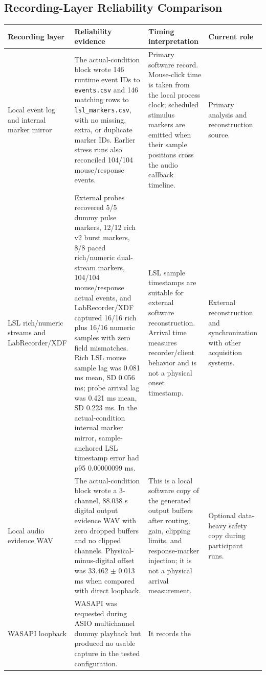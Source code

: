 \documentclass[11pt]{article}
\begin{document}
\subsection{Recording-Layer Reliability Comparison}

\begin{longtable}{|p{}|p{}|p{}|p{}|}
\hline
\textbf{Recording layer} & \textbf{Reliability evidence} & \textbf{Timing interpretation} & \textbf{Current role} \\
\hline
Local event log and internal marker mirror & The actual-condition block wrote
146 runtime event IDs to \texttt{events.csv} and 146 matching rows to
\texttt{lsl\_markers.csv}, with no missing, extra, or duplicate marker IDs.
Earlier stress runs also reconciled 104/104 mouse/response events. & Primary
software record. Mouse-click time is taken from the local process clock;
scheduled stimulus markers are emitted when their sample positions cross the
audio callback timeline. & Primary analysis and reconstruction source. \\
\hline
LSL rich/numeric streams and LabRecorder/XDF & External probes recovered 5/5
dummy pulse markers, 12/12 rich v2 burst markers, 8/8 paced rich/numeric
dual-stream markers, 104/104 mouse/response actual events, and LabRecorder/XDF
captured 16/16 rich plus 16/16 numeric samples with zero field mismatches. Rich
LSL mouse sample lag was 0.081 ms mean, SD 0.056 ms; probe arrival lag was
0.421 ms mean, SD 0.223 ms. In the actual-condition internal marker mirror,
sample-anchored LSL timestamp error had p95 0.00000099 ms. & LSL sample
timestamps are suitable for external software reconstruction. Arrival time
measures recorder/client behavior and is not a physical onset timestamp. &
External reconstruction and synchronization with other acquisition systems. \\
\hline
Local audio evidence WAV & The actual-condition block wrote a 3-channel,
88.038 s digital output evidence WAV with zero dropped buffers and no clipped
channels. Physical-minus-digital offset was 33.462 $\pm$ 0.013 ms when compared
with direct loopback. & This is a local software copy of the generated output
buffers after routing, gain, clipping limits, and response-marker injection; it
is not a physical arrival measurement. & Optional data-heavy safety copy during
participant runs. \\
\hline
WASAPI loopback & WASAPI was requested during ASIO multichannel dummy playback
but produced no usable capture in the tested configuration. & It records the

\end{longtable}
\end{document}
